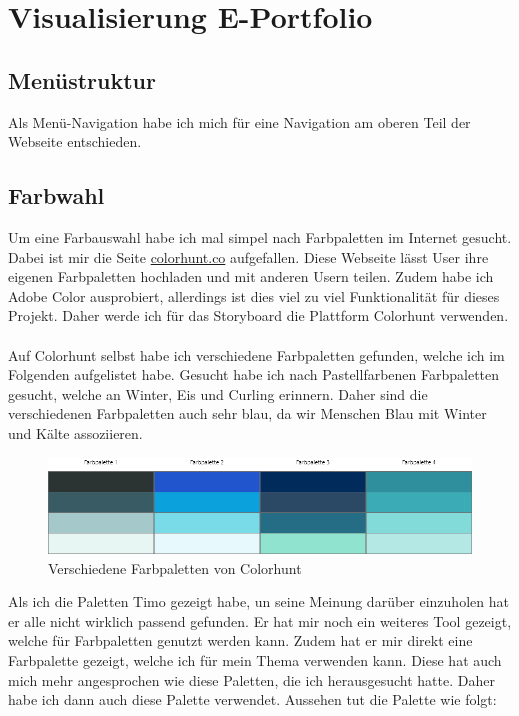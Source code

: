 \documentclass[11pt]{article}
\begin{document}
    \section{Visualisierung E-Portfolio}

    \subsection{Menüstruktur}
    Als Menü-Navigation habe ich mich für eine Navigation am oberen Teil der Webseite entschieden. %

    \subsection{Farbwahl}
    Um eine Farbauswahl habe ich mal simpel nach Farbpaletten im Internet gesucht. Dabei ist mir die Seite
    \url{colorhunt.co} aufgefallen. Diese Webseite lässt User ihre eigenen Farbpaletten hochladen und mit
    anderen Usern teilen. Zudem habe ich Adobe Color ausprobiert, allerdings ist dies viel zu viel
    Funktionalität für dieses Projekt. Daher werde ich für das Storyboard die Plattform Colorhunt verwenden.\\
    \\
    Auf Colorhunt selbst habe ich verschiedene Farbpaletten gefunden, welche ich im Folgenden aufgelistet
    habe. Gesucht habe ich nach Pastellfarbenen Farbpaletten gesucht, welche an Winter, Eis und Curling erinnern.
    Daher sind die verschiedenen Farbpaletten auch sehr blau, da wir Menschen Blau mit Winter und Kälte
    assoziieren.

    \begin{figure}[h]
        \includegraphics[width=\textwidth]{media/color_palettes}
        \caption{Verschiedene Farbpaletten von Colorhunt}
    \end{figure}

    \pagebreak
    Als ich die Paletten Timo gezeigt habe, un seine Meinung darüber einzuholen hat er alle nicht wirklich passend
    gefunden. Er hat mir noch ein weiteres Tool gezeigt, welche für Farbpaletten genutzt werden kann. Zudem hat er
    mir direkt eine Farbpalette gezeigt, welche ich für mein Thema verwenden kann. Diese hat auch mich mehr
    angesprochen wie diese Paletten, die ich herausgesucht hatte. Daher habe ich dann auch diese Palette verwendet.
    Aussehen tut die Palette wie folgt:
\end{document}
